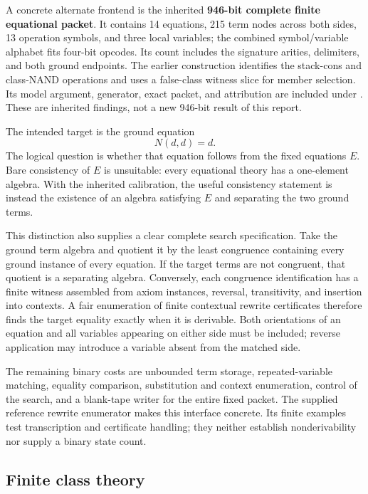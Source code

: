 A concrete alternate frontend is the inherited \textbf{946-bit complete
finite equational packet}.  It contains 14 equations, 215 term nodes
across both sides, 13 operation symbols, and three local variables; the
combined symbol/variable alphabet fits four-bit opcodes.  Its count
includes the signature arities, delimiters, and both ground endpoints.
The earlier construction identifies the stack-cons and class-NAND
operations and uses a false-class witness slice for member selection.
Its model argument, generator, exact packet, and attribution are included
under .  These are inherited findings,
not a new 946-bit result of this report.

The intended target is the ground equation
\[
 N(d,d)=d.
\]
The logical question is whether that equation follows from the fixed
equations $E$.  Bare consistency of $E$ is unsuitable: every equational
theory has a one-element algebra.  With the inherited calibration, the
useful consistency statement is instead the existence of an algebra
satisfying $E$ and separating the two ground terms.

This distinction also supplies a clear complete search specification.
Take the ground term algebra and quotient it by the least congruence
containing every ground instance of every equation.  If the target terms
are not congruent, that quotient is a separating algebra.  Conversely,
each congruence identification has a finite witness assembled from axiom
instances, reversal, transitivity, and insertion into contexts.  A fair
enumeration of finite contextual rewrite certificates therefore finds
the target equality exactly when it is derivable.  Both orientations of
an equation and all variables appearing on either side must be included;
reverse application may introduce a variable absent from the matched side.

The remaining binary costs are unbounded term storage, repeated-variable
matching, equality comparison, substitution and context enumeration,
control of the search, and a blank-tape writer for the entire fixed packet.
The supplied reference rewrite enumerator makes this interface concrete.
Its finite examples test transcription and certificate handling; they
neither establish nonderivability nor supply a binary state count.

\subsection{Finite class theory}


